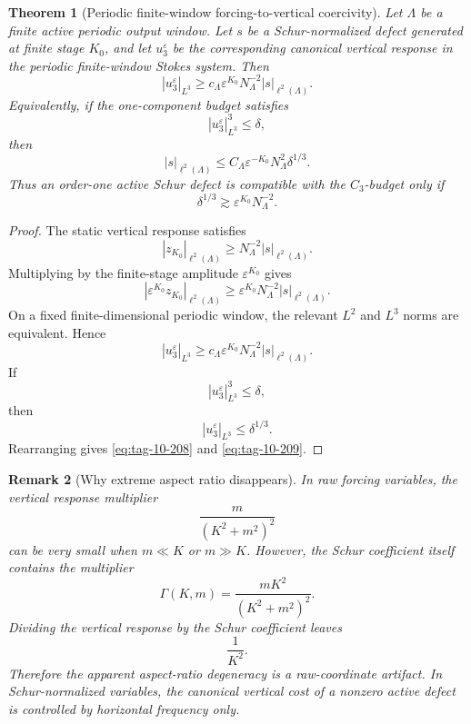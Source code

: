 \documentclass[11pt]{article}
\numberwithin{equation}{section}
\newtheorem{theorem}{Theorem}[section]
\newtheorem{remark}[theorem]{Remark}
\begin{document}
\begin{theorem}[Periodic finite-window forcing-to-vertical coercivity]
Let \(\Lambda\) be a finite active periodic output window. Let \(s\) be a Schur-normalized defect generated at finite stage \(K_0\), and let \(u_3^\varepsilon\) be the corresponding canonical vertical response in the periodic finite-window Stokes system. Then
\begin{equation}
|u_3^\varepsilon|_{L^3}
\ge
c_\Lambda
\varepsilon^{K_0}
N_\Lambda^{-2}
|s|_{\ell^2(\Lambda)}.
\label{eq:tag-10-207}
\end{equation}
Equivalently, if the one-component budget satisfies
\[
|u_3^\varepsilon|_{L^3}^3\le\delta,
\]
then
\begin{equation}
|s|_{\ell^2(\Lambda)}
\le
C_\Lambda
\varepsilon^{-K_0}
N_\Lambda^2
\delta^{1/3}.
\label{eq:tag-10-208}
\end{equation}
Thus an order-one active Schur defect is compatible with the \(C_3\)-budget only if
\begin{equation}
\delta^{1/3}
\gtrsim
\varepsilon^{K_0}N_\Lambda^{-2}.
\label{eq:tag-10-209}
\end{equation}

\end{theorem}

\begin{proof}
The static vertical response satisfies
\[
|z_{K_0}|_{\ell^2(\Lambda)}
\ge
N_\Lambda^{-2}
|s|_{\ell^2(\Lambda)}.
\]
Multiplying by the finite-stage amplitude \(\varepsilon^{K_0}\) gives
\[
|\varepsilon^{K_0}z_{K_0}|_{\ell^2(\Lambda)}
\ge
\varepsilon^{K_0}N_\Lambda^{-2}
|s|_{\ell^2(\Lambda)}.
\]
On a fixed finite-dimensional periodic window, the relevant \(L^2\) and \(L^3\) norms are equivalent. Hence
\[
|u_3^\varepsilon|_{L^3}
\ge
c_\Lambda
\varepsilon^{K_0}N_\Lambda^{-2}
|s|_{\ell^2(\Lambda)}.
\]
If
\[
|u_3^\varepsilon|_{L^3}^3\le\delta,
\]
then
\[
|u_3^\varepsilon|_{L^3}\le \delta^{1/3}.
\]
Rearranging gives \eqref{eq:tag-10-208} and \eqref{eq:tag-10-209}.
\end{proof}

\begin{remark}[Why extreme aspect ratio disappears]
In raw forcing variables, the vertical response multiplier
\[
\frac{m}{(K^2+m^2)^2}
\]
can be very small when \(m\ll K\) or \(m\gg K\). However, the Schur coefficient itself contains the multiplier
\[
\Gamma(K,m)=\frac{mK^2}{(K^2+m^2)^2}.
\]
Dividing the vertical response by the Schur coefficient leaves
\[
\frac{1}{K^2}.
\]
Therefore the apparent aspect-ratio degeneracy is a raw-coordinate artifact. In Schur-normalized variables, the canonical vertical cost of a nonzero active defect is controlled by horizontal frequency only.
\end{remark}
\end{document}
